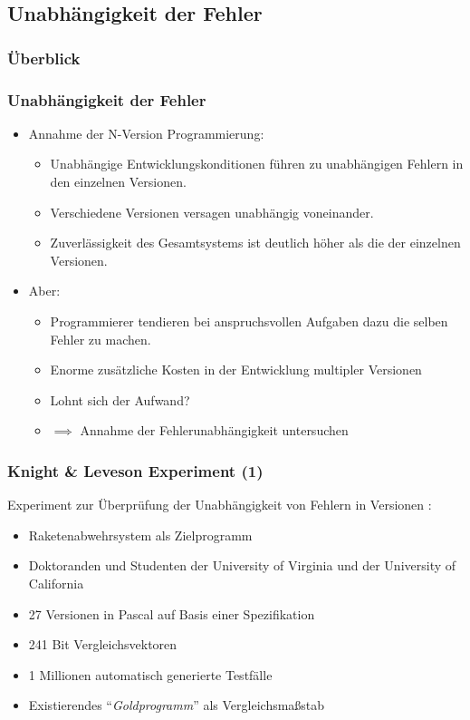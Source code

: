 \subsection{Unabhängigkeit der Fehler}
%
\begin{frame}
	\frametitle{Überblick}
	\tableofcontents[currentsubsection]
\end{frame}
%
\begin{frame}
	\frametitle{Unabhängigkeit der Fehler}
	\begin{itemize}
		\item Annahme der N-Version Programmierung:
			\begin{itemize}
				\item Unabhängige Entwicklungskonditionen führen zu unabhängigen Fehlern in den einzelnen Versionen.
				\item Verschiedene Versionen versagen unabhängig voneinander.
				\item Zuverlässigkeit des Gesamtsystems ist deutlich höher als die der einzelnen Versionen.
			\end{itemize}
			\pause
			\item Aber:
			\begin{itemize}
				\item Programmierer tendieren bei anspruchsvollen Aufgaben dazu die selben Fehler zu machen.
				\item Enorme zusätzliche Kosten in der Entwicklung multipler Versionen
				\item Lohnt sich der Aufwand?
				\item $\implies$ Annahme der Fehlerunabhängigkeit untersuchen
			\end{itemize}
		
	\end{itemize}
	
\end{frame}
%
%
\begin{frame}
	\frametitle{Knight \& Leveson Experiment (1)}

	 Experiment zur Überprüfung der Unabhängigkeit von Fehlern in Versionen \cite{Knight:1986:EEA:10677.10688}:
		\begin{itemize}
			\item Raketenabwehrsystem als Zielprogramm
			\item Doktoranden und Studenten der University of Virginia und der University of California
			\item 27 Versionen in Pascal auf Basis einer Spezifikation
			\item 241 Bit Vergleichsvektoren
			\item 1 Millionen automatisch generierte Testfälle
			\item Existierendes \enquote{\emph{Goldprogramm}} als Vergleichsmaßstab
			
		\end{itemize}

\end{frame}
